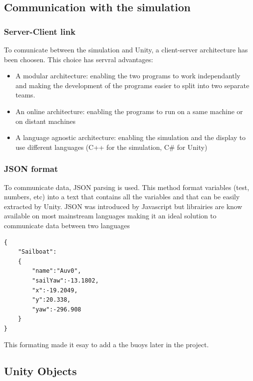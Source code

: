 \documentclass[a4paper]{report}
\begin{document}
\subsection{Communication with the simulation}
\subsubsection{Server-Client link}

To comunicate between the simulation and Unity, a client-server architecture has been choosen. This choice has servral advantages:
\begin{itemize}
\item A modular architecture: enabling the two programs to work independantly and making the development of the programs easier to split into two separate teams.
\item An online architecture: enabling the programs to run on a same machine or on distant machines
\item A language agnostic architecture: enabling the simulation and the display to use different languages (C++ for the simulation, C\# for Unity)
\end{itemize}

\subsubsection{JSON format}

To communicate data, JSON parsing is used. This method format variables (test, numbers, etc) into a text that contains all the variables and that can be easily extracted by Unity. JSON was introduced by Javascript but librairies are know available on most mainstream languages making it an ideal solution to communicate data between two languages

\renewcommand{\lstlistingname}{Code}
\begin{lstlisting}[caption=JSON format, frame=single]
{
    "Sailboat":
    {
        "name":"Auv0",
        "sailYaw":-13.1802,
        "x":-19.2049,
        "y":20.338,
        "yaw":-296.908
    }
}
\end{lstlisting}

This formating made it esay to add a the buoys later in the project. %

\subsection{Unity Objects}
\end{document}
